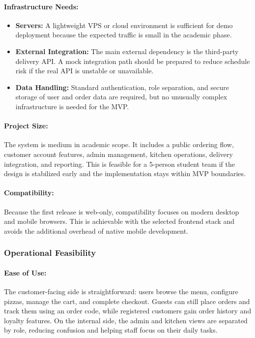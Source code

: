 \paragraph{Infrastructure Needs:}
\begin{itemize}
    \item \textbf{Servers:} A lightweight VPS or cloud environment is sufficient for demo deployment because the expected traffic is small in the academic phase.
    \item \textbf{External Integration:} The main external dependency is the third-party delivery API. A mock integration path should be prepared to reduce schedule risk if the real API is unstable or unavailable.
    \item \textbf{Data Handling:} Standard authentication, role separation, and secure storage of user and order data are required, but no unusually complex infrastructure is needed for the MVP.
\end{itemize}

\paragraph{Project Size:} The system is medium in academic scope. It includes a public ordering flow, customer account features, admin management, kitchen operations, delivery integration, and reporting. This is feasible for a 5-person student team if the design is stabilized early and the implementation stays within MVP boundaries.

\paragraph{Compatibility:} Because the first release is web-only, compatibility focuses on modern desktop and mobile browsers. This is achievable with the selected frontend stack and avoids the additional overhead of native mobile development.

\subsubsection{Operational Feasibility}

\paragraph{Ease of Use:} The customer-facing side is straightforward: users browse the menu, configure pizzas, manage the cart, and complete checkout. Guests can still place orders and track them using an order code, while registered customers gain order history and loyalty features. On the internal side, the admin and kitchen views are separated by role, reducing confusion and helping staff focus on their daily tasks.

